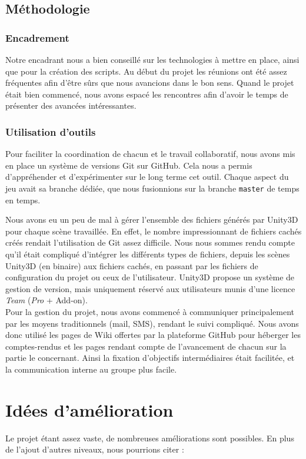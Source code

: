 \documentclass[a4paper,11pt]{article}
\begin{document}
\subsection{Méthodologie}
\subsubsection{Encadrement}
Notre encadrant nous a bien conseillé sur les technologies à mettre en place, ainsi que pour la création des scripts. Au début du projet les réunions ont été assez fréquentes afin d'être sûrs que nous avancions dans le bon sens. Quand le projet était bien commencé, nous avons espacé les rencontres afin d'avoir le temps de présenter des avancées intéressantes. 

\subsubsection{Utilisation d'outils}
Pour faciliter la coordination de chacun et le travail collaboratif, nous avons mis en place un système de versions Git sur GitHub. Cela nous a permis d'appréhender et d'expérimenter sur le long terme cet outil. Chaque aspect du jeu avait sa branche dédiée, que nous fusionnions sur la branche \texttt{master} de temps en temps. 

Nous avons eu un peu de mal à gérer l'ensemble des fichiers générés par Unity3D pour chaque scène travaillée. En effet, le nombre impressionnant de fichiers cachés créés rendait l'utilisation de Git assez difficile. Nous nous sommes rendu compte qu'il était compliqué d'intégrer les différents types de fichiers, depuis les scènes Unity3D (en binaire) aux fichiers cachés, en passant par les fichiers de configuration du projet ou ceux de l'utilisateur. Unity3D propose un système de gestion de version, mais uniquement réservé aux utilisateurs munis d'une licence \textit{Team} (\textit{Pro} + Add-on). \\


Pour la gestion du projet, nous avons commencé à communiquer principalement par les moyens traditionnels (mail, SMS), rendant le suivi compliqué. Nous avons donc utilisé les pages de Wiki offertes par la plateforme GitHub pour héberger les comptes-rendus et les pages rendant compte de l'avancement de chacun sur la partie le concernant. Ainsi la fixation d'objectifs intermédiaires était facilitée, et la communication interne au groupe plus facile.  


\section{Idées d'amélioration}
Le projet étant assez vaste, de nombreuses améliorations sont possibles. En plus de l'ajout d'autres niveaux, nous pourrions citer : 
\end{document}

